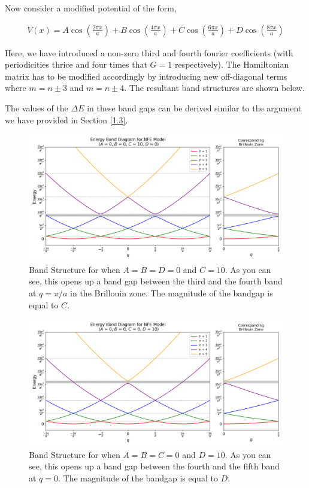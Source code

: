 \documentclass[12pt,a4paper]{article}
\begin{document}
Now consider a modified potential of the form,

\begin{align*}
    V(x) = A\cos\left(\frac{2\pi x}{a}\right) + B\cos\left(\frac{4\pi x}{a}\right) + C\cos\left(\frac{6\pi x}{a}\right) + D\cos\left(\frac{8\pi x}{a}\right)
\end{align*}

Here, we have introduced a non-zero third and fourth fourier coefficients (with periodicities thrice and four times that $G=1$ respectively). The Hamiltonian matrix has to be modified accordingly by introducing new off-diagonal terms where $m=n\pm 3$ and $m=n\pm 4$.
The resultant band structures are shown below.

The values of the $\Delta E$ in these band gaps can be derived similar to the argument we have provided in Section \ref{1.3}.

\begin{figure}[H]
    \centering
    \includegraphics[width=1\linewidth]{images/g3.png}
    \caption{Band Structure for when $A=B=D=0$ and $C=10$. As you can see, this opens up a band gap between the third and the fourth band at $q=\pi/a$ in the Brillouin zone. The magnitude of the bandgap is equal to $C$.}
    \label{g3}
\end{figure}

\begin{figure}[H]
    \centering
    \includegraphics[width=1\linewidth]{images/g4.png}
    \caption{Band Structure for when $A=B=C=0$ and $D=10$. As you can see, this opens up a band gap between the fourth and the fifth band at $q=0$. The magnitude of the bandgap is equal to $D$.}
    \label{g4}
\end{figure}
\end{document}
